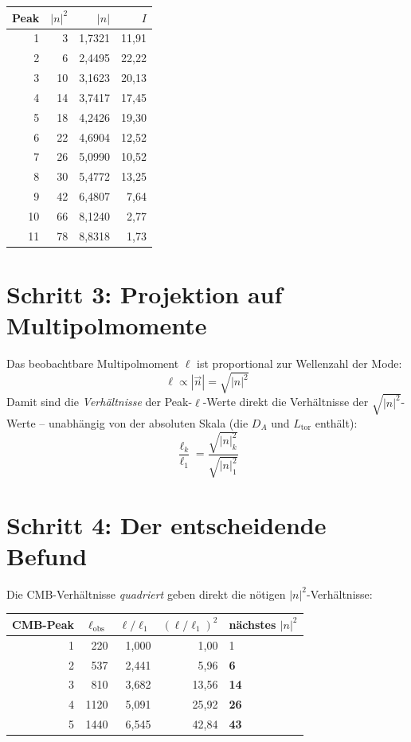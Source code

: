 \begin{center}
\begin{tabular}{rrrr}
\toprule
Peak & $|n|^2$ & $|n|$ & $I$ \\
\midrule
1 & 3  & 1{,}7321 & 11{,}91 \\
2 & 6  & 2{,}4495 & 22{,}22 \\
3 & 10 & 3{,}1623 & 20{,}13 \\
4 & 14 & 3{,}7417 & 17{,}45 \\
5 & 18 & 4{,}2426 & 19{,}30 \\
6 & 22 & 4{,}6904 & 12{,}52 \\
7 & 26 & 5{,}0990 & 10{,}52 \\
8 & 30 & 5{,}4772 & 13{,}25 \\
9 & 42 & 6{,}4807 & 7{,}64  \\
10 & 66 & 8{,}1240 & 2{,}77 \\
11 & 78 & 8{,}8318 & 1{,}73 \\
\bottomrule
\end{tabular}
\end{center}

\section{Schritt 3: Projektion auf Multipolmomente}

Das beobachtbare Multipolmoment $\ell$ ist proportional zur
Wellenzahl der Mode:
\[
  \ell \propto |\vec{n}| = \sqrt{|n|^2}
\]
Damit sind die \emph{Verhältnisse} der Peak-$\ell$-Werte direkt die
Verhältnisse der $\sqrt{|n|^2}$-Werte -- unabhängig von der absoluten
Skala (die $D_A$ und $L_\mathrm{tor}$ enthält):
\[
  \frac{\ell_k}{\ell_1} = \frac{\sqrt{|n|^2_k}}{\sqrt{|n|^2_1}}
\]

\section{Schritt 4: Der entscheidende Befund}

Die CMB-Verhältnisse \emph{quadriert} geben direkt die nötigen
$|n|^2$-Verhältnisse:

\begin{center}
\begin{tabular}{rrrrl}
\toprule
CMB-Peak & $\ell_\mathrm{obs}$ & $\ell/\ell_1$ & $(\ell/\ell_1)^2$ & nächstes $|n|^2$ \\
\midrule
1 & 220  & 1{,}000 & 1{,}00  & 1 \\
2 & 537  & 2{,}441 & 5{,}96  & \textbf{6} \\
3 & 810  & 3{,}682 & 13{,}56 & \textbf{14} \\
4 & 1120 & 5{,}091 & 25{,}92 & \textbf{26} \\
5 & 1440 & 6{,}545 & 42{,}84 & \textbf{43} \\
\bottomrule
\end{tabular}
\end{center}

